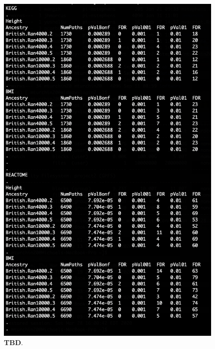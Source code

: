 \documentclass[12pt, a4paper]{article}
\begin{document}
\begin{figure}[htbp]
\centering
\includegraphics[scale=1.5]{Images/Supp/InterPath_Supp_Figure_FDRs_BritReps_vs1.png}
\caption[TBD]{\textbf{TBD}. }
\label{InterPath-Supp-Figure-BritReps-FDRs}
\end{figure}
\clearpage
\end{document}
